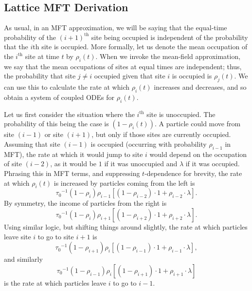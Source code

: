\subsection{Lattice MFT Derivation} 
\label{sec:latticeMFT}
As usual, in an MFT approximation, we will be saying that the equal-time probability of the $(i+1)^\mathrm{th}$ site being occupied is independent of the probability that the $i\mathrm{th}$ site is occupied.
More formally, let us denote the mean occupation of the $i^\mathrm{th}$ site at time $t$ by $\rho_i (t)$. When we invoke the mean-field approximation, we say that the mean occupations of sites at equal times are independent; thus,
the probability that site $j \ne i$ occupied given that site $i$ is occupied is $\rho_j (t)$. We can use this to calculate the rate at which $\rho_i (t)$ increases and decreases, and so obtain a system of coupled ODEs for $\rho_i (t)$.

Let us first consider the situation where the $i^\mathrm{th}$ site is unoccupied. The probability of this being the case is $(1-\rho_i (t))$. A particle could move from site $(i-1)$ or site $(i+1)$, but only if those sites are currently occupied.
Assuming that site $(i-1)$ is occupied (occurring with probability $\rho_{i-1}$ in MFT), the rate at which it would jump to site $i$ would depend on the occupation of site $(i-2)$,
as it would be $1$ if it was unoccupied and $\lambda$ if it was occupied. Phrasing this in MFT terms,
and suppressing $t$-dependence for brevity, the rate at which $\rho_i (t)$ is increased by particles coming from the left is
\begin{equation}
{\tau_0}^{-1} \left(1-\rho_i \right) \rho_{i-1} \left[ \left(1-\rho_{i-2} \right) \cdot 1  +   \rho_{i-2} \cdot \lambda \right].
\end{equation}
By symmetry, the income of particles from the right is
\begin{equation}
{\tau_0}^{-1} \left(1-\rho_i \right) \rho_{i+1} \left[ \left(1-\rho_{i+2} \right) \cdot 1  +   \rho_{i+2} \cdot \lambda \right].
\end{equation}
Using similar logic, but shifting things around slightly, the rate at which particles leave site $i$ to go to site $i+1$ is
\begin{equation}
{\tau_0}^{-1} \left(1-\rho_{i+1} \right) \rho_{i} \left[ \left(1-\rho_{i-1} \right) \cdot 1  +   \rho_{i-1} \cdot \lambda \right],
\end{equation}
and similarly 
\begin{equation}
{\tau_0}^{-1} \left(1-\rho_{i-1} \right) \rho_{i} \left[ \left(1-\rho_{i+1} \right) \cdot 1  +   \rho_{i+1} \cdot \lambda \right]
\end{equation}
is the rate at which particles leave $i$ to go to $i-1$.

